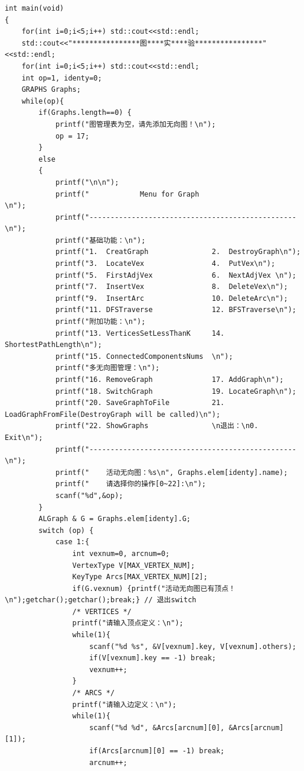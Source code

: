 \documentclass[supercite]{Experimental_Report}
\theoremstyle{definition}
\begin{document}
\begin{lstlisting}
int main(void)
{
    for(int i=0;i<5;i++) std::cout<<std::endl;
    std::cout<<"****************图****实****验****************"<<std::endl;
    for(int i=0;i<5;i++) std::cout<<std::endl;
    int op=1, identy=0;
    GRAPHS Graphs;
    while(op){
        if(Graphs.length==0) {
            printf("图管理表为空，请先添加无向图！\n");
            op = 17;
        }
        else
        {
            printf("\n\n");
            printf("            Menu for Graph                       \n");
            printf("-------------------------------------------------\n");
            printf("基础功能：\n");
            printf("1.  CreatGraph               2.  DestroyGraph\n");
            printf("3.  LocateVex                4.  PutVex\n");
            printf("5.  FirstAdjVex              6.  NextAdjVex \n");
            printf("7.  InsertVex                8.  DeleteVex\n");
            printf("9.  InsertArc                10. DeleteArc\n");
            printf("11. DFSTraverse              12. BFSTraverse\n");
            printf("附加功能：\n");
            printf("13. VerticesSetLessThanK     14. ShortestPathLength\n");
            printf("15. ConnectedComponentsNums  \n");
            printf("多无向图管理：\n");
            printf("16. RemoveGraph              17. AddGraph\n");
            printf("18. SwitchGraph              19. LocateGraph\n");
            printf("20. SaveGraphToFile          21. LoadGraphFromFile(DestroyGraph will be called)\n");
            printf("22. ShowGraphs               \n退出：\n0.  Exit\n");
            printf("-------------------------------------------------\n");
            printf("    活动无向图：%s\n", Graphs.elem[identy].name);
            printf("    请选择你的操作[0~22]:\n");
            scanf("%d",&op);
        }
        ALGraph & G = Graphs.elem[identy].G;
        switch (op) {
            case 1:{
                int vexnum=0, arcnum=0;
                VertexType V[MAX_VERTEX_NUM];
                KeyType Arcs[MAX_VERTEX_NUM][2];
                if(G.vexnum) {printf("活动无向图已有顶点！\n");getchar();getchar();break;} // 退出switch
                /* VERTICES */
                printf("请输入顶点定义：\n");
                while(1){
                    scanf("%d %s", &V[vexnum].key, V[vexnum].others);
                    if(V[vexnum].key == -1) break;
                    vexnum++;
                }
                /* ARCS */
                printf("请输入边定义：\n");
                while(1){
                    scanf("%d %d", &Arcs[arcnum][0], &Arcs[arcnum][1]);
                    if(Arcs[arcnum][0] == -1) break;
                    arcnum++;

\end{lstlisting}
\end{document}
